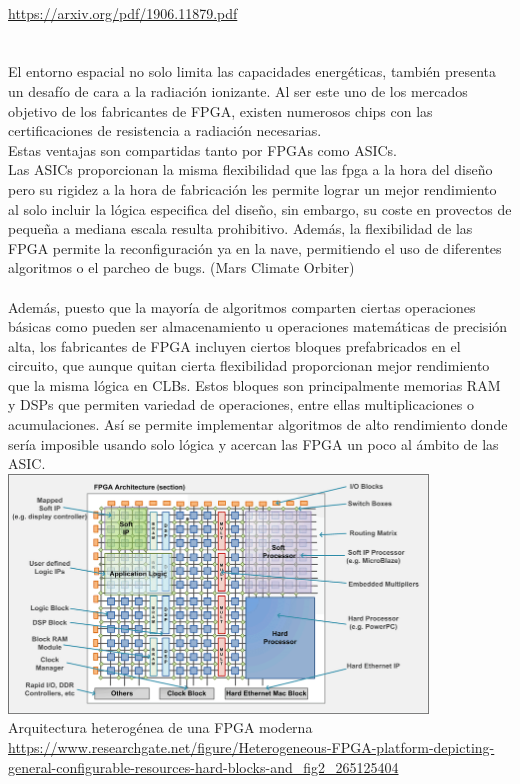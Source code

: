 \\
\url{https://arxiv.org/pdf/1906.11879.pdf}
\\
\\
\\
El entorno espacial no solo limita las capacidades energéticas, también presenta un desafío de cara a la radiación ionizante. Al ser este uno de los mercados objetivo de los fabricantes de FPGA, existen numerosos chips con las certificaciones de resistencia a radiación necesarias.
\\
Estas ventajas son compartidas tanto por FPGAs como ASICs.
\\
Las ASICs proporcionan la misma flexibilidad que las fpga a la hora del diseño pero su rigidez a la hora de fabricación les permite lograr un mejor rendimiento al solo incluir la lógica especifica del diseño, sin embargo, su coste en provectos de pequeña a mediana escala resulta prohibitivo. Además, la flexibilidad de las FPGA permite la reconfiguración ya en la nave, permitiendo el uso de diferentes algoritmos o el parcheo de bugs. (Mars Climate Orbiter)
\\
\\
Además, puesto que la mayoría de algoritmos comparten ciertas operaciones básicas como pueden ser almacenamiento u operaciones matemáticas de precisión alta, los fabricantes de FPGA incluyen ciertos bloques prefabricados en el circuito, que aunque quitan cierta flexibilidad proporcionan mejor rendimiento que la misma lógica en CLBs. Estos bloques son principalmente memorias RAM y DSPs que permiten variedad de operaciones, entre ellas multiplicaciones o acumulaciones. Así se permite implementar algoritmos de alto rendimiento donde sería imposible usando solo lógica y acercan las FPGA un poco al ámbito de las ASIC.
\\
\includegraphics[height=2.5in]{figures/FPGA_heterogenea.png}
\\
Arquitectura heterogénea de una FPGA moderna
\\
\url{https://www.researchgate.net/figure/Heterogeneous-FPGA-platform-depicting-general-configurable-resources-hard-blocks-and_fig2_265125404}


